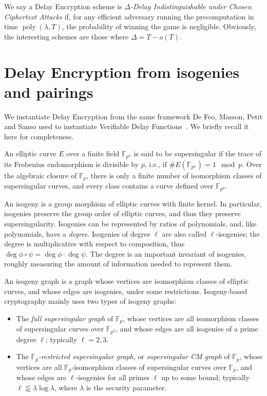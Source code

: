 \documentclass{llncs}
\newcommand{\F}{\mathbb{F}}
\DeclareMathOperator{\poly}{poly}
\begin{document}
We say a Delay Encryption scheme is \emph{$\Delta$-Delay
  Indistinguishable under Chosen Ciphertext Attacks} if, for any
efficient adversary running the precomputation in time
$\poly(\lambda,T)$, the probability of winning the game is
negligible. %
Obviously, the interesting schemes are those where $\Delta = T-o(T)$.


\section{Delay Encryption from isogenies and pairings}
\label{sec:delay-encrypt-from}

We instantiate Delay Encryption from the same framework De Feo,
Masson, Petit and Sanso used to instantiate Verifiable Delay
Functions~\cite{10.1007/978-3-030-34578-5_10}. %
We briefly recall it here for completeness.

An elliptic curve $E$ over a finite field $\F_{p^n}$ is said to be
supersingular if the trace of its Frobenius endomorphism is divisible
by $p$, i.e., if $\#E(\F_{p^n})=1\mod p$. %
Over the algebraic closure of $\F_p$, there is only a finite number of
isomorphism classes of supersingular curves, and every class contains
a curve defined over $\F_{p^2}$.

An isogeny is a group morphism of elliptic curves with finite
kernel. %
In particular, isogenies preserve the group order of elliptic curves,
and thus they preserve supersingularity. %
Isogenies can be represented by ratios of polynomials, and, like
polynomials, have a \emph{degree}. %
Isogenies of degree $\ell$ are also called $\ell$-isogenies; the
degree is multiplicative with respect to composition, thus
$\deg\phi\circ\psi=\deg\phi\cdot\deg\psi$. %
The degree is an important invariant of isogenies, roughly measuring
the amount of information needed to represent them.

An isogeny graph is a graph whose vertices are isomorphism classes of
elliptic curves, and whose edges are isogenies, under some
restrictions. %
Isogeny-based cryptography mainly uses two types of isogeny graphs:
\begin{itemize}
\item The \emph{full supersingular graph} of $\F_p$, whose vertices
  are all isomorphism classes of supersingular curves over $\F_{p^2}$,
  and whose edges are all isogenies of a prime degree $\ell$;
  typically $\ell=2,3$.
\item The \emph{$\F_p$-restricted supersingular graph}, or
  \emph{supersingular CM graph} of $\F_p$, whose vertices are all
  $\F_p$-isomorphism classes of supersingular curves over $\F_p$, and
  whose edges are $\ell$-isogenies for all primes $\ell$ up to some
  bound; typically $\ell\lessapprox\lambda\log\lambda$, where
  $\lambda$ is the security parameter.
\end{itemize}
\end{document}
